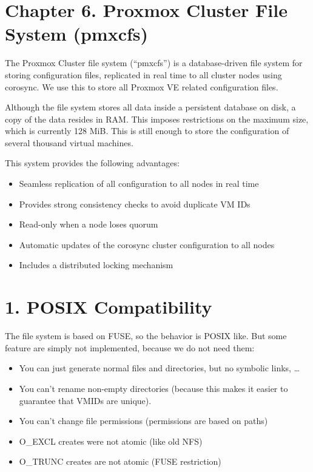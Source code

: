 \section{Chapter 6. Proxmox Cluster File System (pmxcfs)}

The Proxmox Cluster file system (“pmxcfs”) is a database-driven file system for storing configuration files, replicated in real time to all cluster nodes using corosync. We use this to store all Proxmox VE related configuration files.

Although the file system stores all data inside a persistent database on disk, a copy of the data resides in RAM. This imposes restrictions on the maximum size, which is currently 128 MiB. This is still enough to store the configuration of several thousand virtual machines.

This system provides the following advantages:

\begin{itemize}[leftmargin=2cm]

	\item Seamless replication of all configuration to all nodes in real time

	\item Provides strong consistency checks to avoid duplicate VM IDs

	\item Read-only when a node loses quorum

	\item Automatic updates of the corosync cluster configuration to all nodes

	\item Includes a distributed locking mechanism

\end{itemize}


\section{1. POSIX Compatibility}

The file system is based on FUSE, so the behavior is POSIX like. But some feature are simply not implemented, because we do not need them:

\begin{itemize}[leftmargin=2cm]

	\item You can just generate normal files and directories, but no symbolic links, …

	\item You can’t rename non-empty directories (because this makes it easier to guarantee that VMIDs are unique).

	\item You can’t change file permissions (permissions are based on paths)

	\item O_EXCL creates were not atomic (like old NFS)

	\item O_TRUNC creates are not atomic (FUSE restriction)

\end{itemize}


